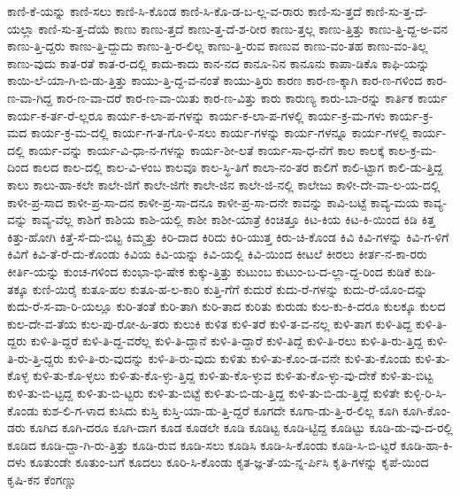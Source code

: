 {ಕಾಣಿ-ಕೆ-ಯನ್ನು
ಕಾಣಿ-ಸಲು
ಕಾಣಿ-ಸಿ-ಕೊಂಡ
ಕಾಣಿ-ಸಿ-ಕೊ-ಡ-ಬ-ಲ್ಲ-ವ-ರಾರು
ಕಾಣಿ-ಸು-ತ್ತದೆ
ಕಾಣಿ-ಸು-ತ್ತ-ದೆ-ಯಲ್ಲಾ
ಕಾಣಿ-ಸು-ತ್ತ-ದೆಯೆ
ಕಾಣು
ಕಾಣು-ತ್ತದೆ
ಕಾಣು-ತ್ತ-ದೆ-ಶ-ರೀರ
ಕಾಣು-ತ್ತಲ್ಲ
ಕಾಣು-ತ್ತಿತ್ತು
ಕಾಣು-ತ್ತಿ-ದ್ದ-ಅ-ವನ
ಕಾಣು-ತ್ತಿ-ದ್ದರು
ಕಾಣು-ತ್ತಿ-ದ್ದುದು
ಕಾಣು-ತ್ತಿ-ರ-ಲಿಲ್ಲ
ಕಾಣು-ತ್ತಿ-ರುವ
ಕಾಣುವ
ಕಾಣು-ವಂ-ತಹ
ಕಾಣು-ವಂ-ತಿಲ್ಲ
ಕಾಣು-ವುದು
ಕಾತ-ರತೆ
ಕಾತ-ರ-ದಲ್ಲಿ
ಕಾದು-ಕಾದು
ಕಾನ-ನದ
ಕಾನೂ-ನಿನ
ಕಾನೂನು
ಕಾಪಾ-ಡಿಕೊ
ಕಾಫಿ-ಯನ್ನು
ಕಾಯಿ-ಲೆ-ಯಾ-ಗಿ-ಬಿ-ಡು-ತ್ತಿತ್ತು
ಕಾಯು-ತ್ತಿ-ದ್ದ-ವ-ನಂತೆ
ಕಾಯು-ತ್ತಿರು
ಕಾರಣ
ಕಾರ-ಣ-ಕ್ಕಾಗಿ
ಕಾರ-ಣ-ಗಳಿಂದ
ಕಾರ-ಣ-ವಾ-ಗಿದ್ದ
ಕಾರ-ಣ-ವಾ-ದರೆ
ಕಾರ-ಣ-ವಾ-ಯಿತು
ಕಾರ-ಣ-ವಿತ್ತು
ಕಾರು
ಕಾರುಣ್ಯ
ಕಾರು-ಬಾ-ರನ್ನು
ಕಾರ್ತಿಕ
ಕಾರ್ಯ
ಕಾರ್ಯ-ಕ-ರ್ತ-ರೆ-ಲ್ಲರೂ
ಕಾರ್ಯ-ಕ-ಲಾ-ಪ-ಗಳನ್ನು
ಕಾರ್ಯ-ಕ-ಲಾ-ಪ-ಗಳಲ್ಲಿ
ಕಾರ್ಯ-ಕ್ರ-ಮ-ಗಳು
ಕಾರ್ಯ-ಕ್ರ-ಮದ
ಕಾರ್ಯ-ಕ್ರ-ಮ-ದಲ್ಲಿ
ಕಾರ್ಯ-ಗ-ತ-ಗೊ-ಳಿ-ಸಲು
ಕಾರ್ಯ-ಗಳನ್ನು
ಕಾರ್ಯ-ಗಳನ್ನೂ
ಕಾರ್ಯ-ಗಳಲ್ಲಿ
ಕಾರ್ಯ-ದಲ್ಲಿ
ಕಾರ್ಯ-ವನ್ನು
ಕಾರ್ಯ-ವಿ-ಧಾ-ನ-ಗಳನ್ನು
ಕಾರ್ಯ-ಶೀ-ಲತೆ
ಕಾರ್ಯ-ಸಾ-ಧ-ನೆಗೆ
ಕಾಲ
ಕಾಲಕ್ಕೆ
ಕಾಲ-ಕ್ರ-ಮ-ದಿಂದ
ಕಾಲದ
ಕಾಲ-ದಲ್ಲಿ
ಕಾಲ-ವಿ-ಳಂಬ
ಕಾಲವೂ
ಕಾಲ-ಸ್ಥಿ-ತಿಗೆ
ಕಾಲಾ-ನಂ-ತರ
ಕಾಲಿಗೆ
ಕಾಲಿ-ಟ್ಟಾಗ
ಕಾಲಿ-ಡು-ತ್ತಿದ್ದ
ಕಾಲು
ಕಾಲು-ಹಾ-ಕಲೇ
ಕಾಲೇ-ಜಿಗೆ
ಕಾಲೇ-ಜಿಗೇ
ಕಾಲೇ-ಜಿನ
ಕಾಲೇ-ಜಿ-ನಲ್ಲಿ
ಕಾಲೇಜು
ಕಾಳೀ-ದೇ-ವಾ-ಲ-ಯ-ದಲ್ಲಿ
ಕಾಳೀ-ಪ್ರ-ಸಾದ
ಕಾಳೀ-ಪ್ರ-ಸಾ-ದನ
ಕಾಳೀ-ಪ್ರ-ಸಾ-ದನೂ
ಕಾಳೀ-ಪ್ರ-ಸಾ-ದನೇ
ಕಾವನ್ನು
ಕಾವಿ-ಬಟ್ಟೆ
ಕಾವ್ಯ-ಮಯ
ಕಾವ್ಯ-ವನ್ನು
ಕಾವ್ಯ-ವೆಲ್ಲ
ಕಾಶಿಗೆ
ಕಾಶಿಯ
ಕಾಶಿ-ಯಲ್ಲಿ
ಕಾಶೀ
ಕಾಶೀ-ಯಾತ್ರೆ
ಕಿಂಚಿತ್ತೂ
ಕಿಟ-ಕಿಯ
ಕಿಟ-ಕಿ-ಯಿಂದ
ಕಿಡಿ
ಕಿತ್ತ
ಕಿತ್ತು-ಹೋಗಿ
ಕಿತ್ತೆ-ಸೆ-ದು-ಬಿಟ್ಟ
ಕಿಮ್ಮತ್ತು
ಕಿರಿ-ದಾದ
ಕಿರಿದು
ಕಿರಿ-ಯುತ್ತ
ಕಿರು-ಚಿ-ಕೊಂಡ
ಕಿವಿ
ಕಿವಿ-ಗಳನ್ನು
ಕಿವಿ-ಗ-ಳಿಗೆ
ಕಿವಿಗೆ
ಕಿವಿ-ತೆ-ರೆ-ದು-ಕೊಂಡು
ಕಿವಿಯ
ಕಿವಿ-ಯನ್ನು
ಕಿವಿ-ಯಲ್ಲಿ
ಕಿವಿ-ಯಿಂದ
ಕೀಟಲೆ
ಕೀರಲು
ಕೀರ್ತ-ನ-ಕಾ-ರರು
ಕೀರ್ತಿ-ಯನ್ನು
ಕುಂಚ-ಗಳಿಂದ
ಕುಂಭಾ-ಭಿ-ಷೇಕ
ಕುಕ್ಕು-ತ್ತಿತ್ತು
ಕುಟುಂಬ
ಕುಟುಂ-ಬ-ದ-ಲ್ಲಾ-ದ್ದ-ರಿಂದ
ಕುಡಿಕೆ
ಕುಡಿ-ತಕ್ಕೂ
ಕುಣಿ-ಯಿರೈ
ಕುತೂ-ಹಲ
ಕುತೂ-ಹ-ಲ-ಕಾರಿ
ಕುತ್ತಿ-ಗೆಗೆ
ಕುದುರೆ
ಕುದು-ರೆ-ಗಳನ್ನು
ಕುದು-ರೆ-ಯೊಂ-ದನ್ನು
ಕುದು-ರೆ-ಸ-ವಾ-ರಿ-ಯಲ್ಲೂ
ಕುರಿ-ತಂತೆ
ಕುರಿ-ತಾಗಿ
ಕುರಿ-ತಾದ
ಕುರಿತು
ಕುರುಡು
ಕುಲ-ಕು-ಕಿ-ದರೂ
ಕುಲಕ್ಕೂ
ಕುಲದ
ಕುಲ-ದೇ-ವ-ತೆಯ
ಕುಲ-ಪು-ರೋ-ಹಿ-ತರು
ಕುಲುಕಿ
ಕುಳಿತ
ಕುಳಿ-ತರೆ
ಕುಳಿ-ತ-ವ-ನಲ್ಲ
ಕುಳಿ-ತಾಗ
ಕುಳಿ-ತಿದ್ದ
ಕುಳಿ-ತಿ-ದ್ದರು
ಕುಳಿ-ತಿ-ದ್ದರೆ
ಕುಳಿ-ತಿ-ದ್ದ-ವರೆಲ್ಲ
ಕುಳಿ-ತಿ-ದ್ದಾನೆ
ಕುಳಿ-ತಿ-ದ್ದಾರೆ
ಕುಳಿ-ತಿದ್ದೆ
ಕುಳಿ-ತಿ-ರಲು
ಕುಳಿ-ತಿ-ರು-ತ್ತಿದ್ದ
ಕುಳಿ-ತಿ-ರು-ತ್ತಿ-ದ್ದರು
ಕುಳಿ-ತಿ-ರು-ವುದನ್ನು
ಕುಳಿ-ತಿ-ರು-ವುದು
ಕುಳಿತು
ಕುಳಿ-ತು-ಕೊಂ-ಡ-ವನೇ
ಕುಳಿ-ತು-ಕೊಂಡು
ಕುಳಿ-ತು-ಕೊಳ್ಳ
ಕುಳಿ-ತು-ಕೊ-ಳ್ಳಲು
ಕುಳಿ-ತು-ಕೊ-ಳ್ಳು-ತ್ತಿದ್ದ
ಕುಳಿ-ತು-ಕೊ-ಳ್ಳುವ
ಕುಳಿ-ತು-ಕೊ-ಳ್ಳು-ವು-ದೇಕೆ
ಕುಳಿ-ತು-ಬಿಟ್ಟ
ಕುಳಿ-ತು-ಬಿ-ಟ್ಟದ್ದ
ಕುಳಿ-ತು-ಬಿ-ಟ್ಟರು
ಕುಳಿ-ತು-ಬಿಟ್ಟೆ
ಕುಳಿ-ತು-ಬಿ-ಡು-ತ್ತಿದ್ದ
ಕುಳಿ-ತು-ಬಿ-ಡು-ತ್ತಿದ್ದೆ
ಕುಳಿತೇ
ಕುಳ್ಳಿ-ರಿ-ಸಿ-ಕೊಂಡು
ಕುಶ-ಲಿ-ಗ-ಳಾದ
ಕುಸಿದು
ಕುಸ್ತಿ
ಕುಸ್ತಿ-ಯಾ-ಡು-ತ್ತಿ-ದ್ದರೆ
ಕೂಗದೇ
ಕೂಗಾ-ಡು-ತ್ತಿ-ರ-ಲಿಲ್ಲ
ಕೂಗಿ
ಕೂಗಿ-ಕೊಂ-ಡರು
ಕೂಗಿದ
ಕೂಗಿ-ದರೂ
ಕೂಗಿ-ದಾಗ
ಕೂಡ
ಕೂಡಲೇ
ಕೂಡಿ
ಕೂಡಿಟ್ಟ
ಕೂಡಿ-ಟ್ಟಿದ್ದ
ಕೂಡಿಟ್ಟು
ಕೂಡಿ-ಡು-ವು-ದ-ರಲ್ಲಿ
ಕೂಡಿದ
ಕೂಡಿ-ದ್ದಾ-ಗಿ-ರು-ತ್ತಿತ್ತು
ಕೂಡಿ-ರುವ
ಕೂಡಿ-ಸಲು
ಕೂಡಿಸಿ
ಕೂಡಿ-ಸಿ-ಕೊಂಡು
ಕೂಡಿ-ಸಿ-ಬಿ-ಟ್ಟರೆ
ಕೂಡಿ-ಹಾ-ಕಿ-ದಳು
ಕೂತುಂಡೇ
ಕೂತುಂ-ಬಗೆ
ಕೂದಲು
ಕೂರಿ-ಸಿ-ಕೊಂಡು
ಕೃತ-ಜ್ಞ-ತೆ-ಯ-ನ್ನ-ರ್ಪಿಸಿ
ಕೃತಿ-ಗಳನ್ನು
ಕೃಪೆ-ಯಿಂದ
ಕೃಷಿ-ಕನ
ಕೆಂಗಣ್ಣು
}
